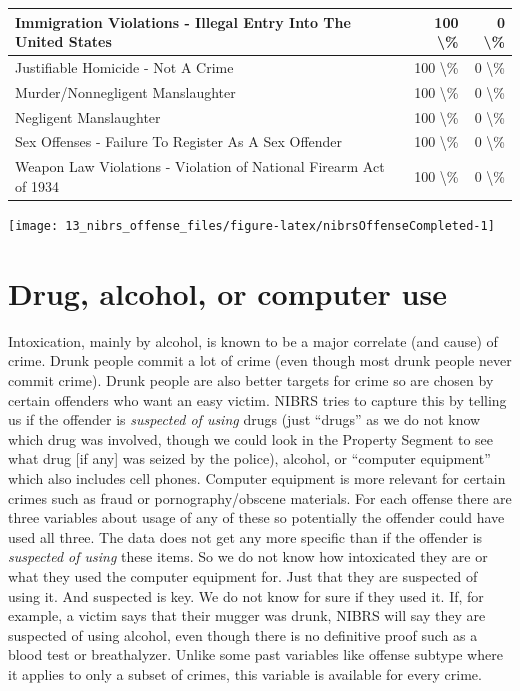 \documentclass[
]{krantz}
\let\origfigure\figure
\let\endorigfigure\endfigure
\renewenvironment{figure}[1][2] {
    \expandafter\origfigure\expandafter[H]
} {
    \endorigfigure
}
\begin{document}
\begin{longtable}[t]{l|r|r}
\hline
Immigration Violations - Illegal Entry Into The United States & 100 \textbackslash{}\% & 0 \textbackslash{}\%\\
\hline
Justifiable Homicide - Not A Crime & 100 \textbackslash{}\% & 0 \textbackslash{}\%\\
\hline
Murder/Nonnegligent Manslaughter & 100 \textbackslash{}\% & 0 \textbackslash{}\%\\
\hline
Negligent Manslaughter & 100 \textbackslash{}\% & 0 \textbackslash{}\%\\
\hline
Sex Offenses - Failure To Register As A Sex Offender & 100 \textbackslash{}\% & 0 \textbackslash{}\%\\
\hline
Weapon Law Violations - Violation of National Firearm Act of 1934 & 100 \textbackslash{}\% & 0 \textbackslash{}\%\\
\hline
\end{longtable}

\begin{figure}

{\centering \texttt{[image: 13\_nibrs\_offense\_files/figure-latex/nibrsOffenseCompleted-1]} 

}

\caption{The annual percent of offenses reported as completed, 1991-2022.}\label{fig:nibrsOffenseCompleted}
\end{figure}

\section{Drug, alcohol, or computer
use}\label{drug-alcohol-or-computer-use}

Intoxication, mainly by alcohol, is known to be a major
correlate (and cause) of crime. Drunk people commit a lot of
crime (even though most drunk people never commit crime).
Drunk people are also better targets for crime so are chosen
by certain offenders who want an easy victim. NIBRS tries to
capture this by telling us if the offender is
\emph{suspected of using} drugs (just ``drugs'' as we do not
know which drug was involved, though we could look in the
Property Segment to see what drug {[}if any{]} was seized by
the police), alcohol, or ``computer equipment'' which also
includes cell phones. Computer equipment is more relevant
for certain crimes such as fraud or pornography/obscene
materials. For each offense there are three variables about
usage of any of these so potentially the offender could have
used all three. The data does not get any more specific than
if the offender is \emph{suspected of using} these items. So
we do not know how intoxicated they are or what they used
the computer equipment for. Just that they are suspected of
using it. And suspected is key. We do not know for sure if
they used it. If, for example, a victim says that their
mugger was drunk, NIBRS will say they are suspected of using
alcohol, even though there is no definitive proof such as a
blood test or breathalyzer. Unlike some past variables like
offense subtype where it applies to only a subset of crimes,
this variable is available for every crime.
\end{document}
